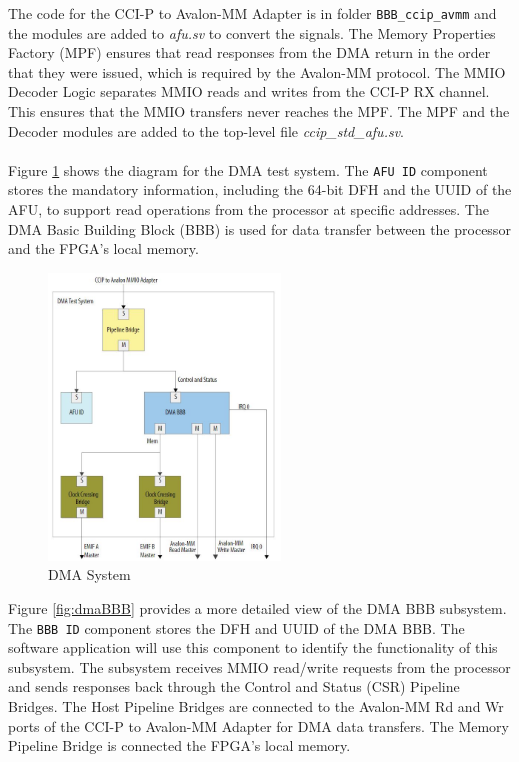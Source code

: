 \documentclass[11pt, twoside, pdftex]{article}
\begin{document}
\noindent
The code for the CCI-P to Avalon-MM Adapter is in folder \verb|BBB_ccip_avmm| and the modules are added to {\it afu.sv} to convert the signals. The Memory Properties Factory (MPF) ensures that read responses from the DMA return in the order that they were issued, which is required by the Avalon-MM protocol. The MMIO Decoder Logic separates MMIO reads and writes from the CCI-P RX channel. This ensures that the MMIO transfers never reaches the MPF. The MPF and the Decoder modules are added to the top-level file {\it ccip\_std\_afu.sv}.\\
\\
Figure \ref{fig:dmaSystem} shows the diagram for the DMA test system. The \texttt{AFU ID} component stores the mandatory information, including the 64-bit DFH and the UUID of the AFU, to support read operations from the processor at specific addresses. The DMA Basic Building Block (BBB) is used for data transfer between the processor and the FPGA's local memory.
\begin{figure}[H]
    \centering
    \includegraphics[width=0.55\textwidth]{figures/DMATestSystem.JPG}
    \caption{DMA System}
    \label{fig:dmaSystem}
\end{figure}

\noindent
Figure \ref{fig:dmaBBB} provides a more detailed view of the DMA BBB subsystem. The \texttt{BBB ID} component stores the DFH and UUID of the DMA BBB. The software application will use this component to identify the functionality of this subsystem. The subsystem receives MMIO read/write requests from the processor and sends responses back through the Control and Status (CSR) Pipeline Bridges. The Host Pipeline Bridges are connected to the Avalon-MM Rd and Wr ports of the CCI-P to Avalon-MM Adapter for DMA data transfers. The Memory Pipeline Bridge is connected the FPGA's local memory.\\
\end{document}
